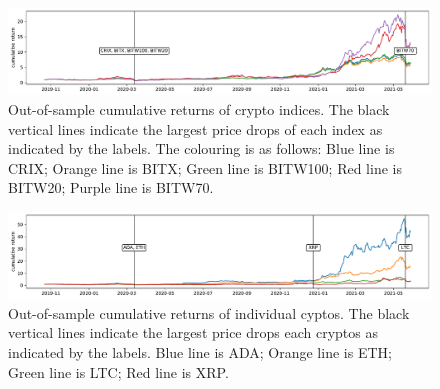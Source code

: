 
\begin{figure}[t]
\includegraphics[width=\textwidth]{_pics/index_price.pdf}
  \caption{Out-of-sample cumulative returns of crypto indices. 
  The black vertical lines indicate the largest price drops of each
  index as indicated by the labels.
  The colouring is as follows:
  \textcolor{plt1}{Blue line} is CRIX;
  \textcolor{plt2}{Orange line} is BITX;
  \textcolor{plt3}{Green line} is BITW100;
  \textcolor{plt4}{Red line} is BITW20;
  \textcolor{plt5}{Purple line} is BITW70.
  }
\label{fig:index_price}
\end{figure}

\begin{figure}[t]
\includegraphics[width=\textwidth]{_pics/individualCoins_price.pdf}
  \caption{Out-of-sample cumulative returns of individual cyptos.
  The black vertical lines indicate the largest price drops each
  cryptos as indicated by the labels.
    \textcolor{plt1}{Blue line} is ADA;
  \textcolor{plt2}{Orange line} is ETH;
  \textcolor{plt3}{Green line} is LTC;
  \textcolor{plt4}{Red line} is XRP.}

\label{fig:individualCoins_price}
\end{figure}

